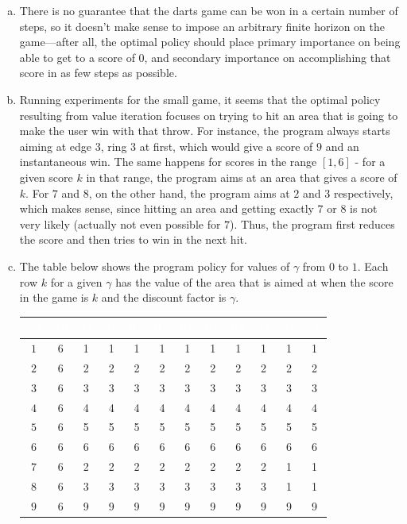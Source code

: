 \documentclass{article}
\begin{document}
\begin{enumerate}
\begin{enumerate}[(a)]
                \item There is no guarantee that the darts game can be won in a certain number of steps, so it doesn't make sense to impose an arbitrary finite horizon on the game---after all, the optimal policy should place primary importance on being able to get to a score of 0, and secondary importance on accomplishing that score in as few steps as possible.
                \item Running experiments for the small game, it seems that the optimal policy resulting from value iteration focuses on trying to hit an area that is going to make the user win with that throw. For instance, the program always starts aiming at edge $3$, ring $3$ at first, which would give a score of $9$ and an instantaneous win. The same happens for scores in the range $[1,6]$ - for a given score $k$ in that range, the program aims at an area that gives a score of $k$. For $7$ and $8$, on the other hand, the program aims at $2$ and $3$ respectively, which makes sense, since hitting an area and getting exactly $7$ or $8$ is not very likely (actually not even possible for $7$). Thus, the program first reduces the score and then tries to win in the next hit.
                
                \item The table below shows the program policy for values of $\gamma$ from $0$ to $1$. Each row $k$ for a given $\gamma$ has the value of the area that is aimed at when the score in the game is $k$ and the discount factor is $\gamma$.
                
\begin{center} \begin{tabular}[h]{|c|c|c|c|c|c|c|c|c|c|c|c|} \hline
\rowcolor{black}
\textcolor{white}{$\gamma/k$} & \textcolor{white}{$0.0$} & \textcolor{white}{$0.1$} &   \textcolor{white}{$0.2$} &  \textcolor{white}{$0.3$} &  \textcolor{white}{$0.4$} &  \textcolor{white}{$0.5$} &  \textcolor{white}{$0.6$} &  \textcolor{white}{$0.7$} &  \textcolor{white}{$0.8$} &  \textcolor{white}{$0.9$} &  \textcolor{white}{$1.0$}\\ \hline
$1$ & 6 & 1 & 1 & 1 & 1 & 1 & 1 & 1 & 1 & 1 & 1 \\
$2$ & 6 & 2 & 2 & 2 & 2 & 2 & 2 & 2 & 2 & 2 & 2 \\
$3$ & 6 & 3 & 3 & 3 & 3 & 3 & 3 & 3 & 3 & 3 & 3 \\
$4$ & 6 & 4 & 4 & 4 & 4 & 4 & 4 & 4 & 4 & 4 & 4 \\
$5$ & 6 & 5 & 5 & 5 & 5 & 5 & 5 & 5 & 5 & 5 & 5 \\
$6$ & 6 & 6 & 6 & 6 & 6 & 6 & 6 & 6 & 6 & 6 & 6 \\
$7$ & 6 & 2 & 2 & 2 & 2 & 2 & 2 & 2 & 2 & 1 & 1 \\
$8$ & 6 & 3 & 3 & 3 & 3 & 3 & 3 & 3 & 3 & 1 & 1 \\
$9$ & 6 & 9 & 9 & 9 & 9 & 9 & 9 & 9 & 9 & 9 & 9 \\ \hline
\end{tabular} \end{center}


\end{enumerate}
\end{enumerate}
\end{document}

